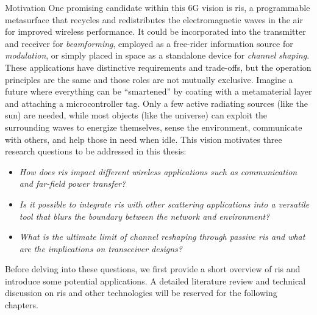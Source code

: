 \begin{section}{Motivation}
	One promising candidate within this 6G vision is \gls{ris}, a programmable metasurface that recycles and redistributes the electromagnetic waves in the air for improved wireless performance.
	It could be incorporated into the transmitter and receiver for \emph{beamforming}, employed as a free-rider information source for \emph{modulation}, or simply placed in space as a standalone device for \emph{channel shaping}.
	These applications have distinctive requirements and trade-offs, but the operation principles are the same and those roles are not mutually exclusive.
	Imagine a future where everything can be ``smartened'' by coating with a metamaterial layer and attaching a microcontroller tag.
	Only a few active radiating sources (like the sun) are needed, while most objects (like the universe) can exploit the surrounding waves to energize themselves, sense the environment, communicate with others, and help those in need when idle.
	This vision motivates three research questions to be addressed in this thesis:
	\begin{itemize}
		\item \emph{How does \gls{ris} impact different wireless applications such as communication and far-field power transfer?}
		\item \emph{Is it possible to integrate \gls{ris} with other scattering applications into a versatile tool that blurs the boundary between the network and environment?}
		\item \emph{What is the ultimate limit of channel reshaping through passive \gls{ris} and what are the implications on transceiver designs?}
	\end{itemize}

	Before delving into these questions, we first provide a short overview of \gls{ris} and introduce some potential applications.
	A detailed literature review and technical discussion on \gls{ris} and other technologies will be reserved for the following chapters.
\end{section}

